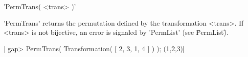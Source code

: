 %

'PermTrans( <trans> )'

'PermTrans' returns  the   permutation  defined by   the   transformation
<trans>.  If <trans> is not bijective, an error is signaled by 'PermList'
(see \"PermList\").

|    gap> PermTrans( Transformation( [ 2, 3, 1, 4 ] ) );
    (1,2,3)|



